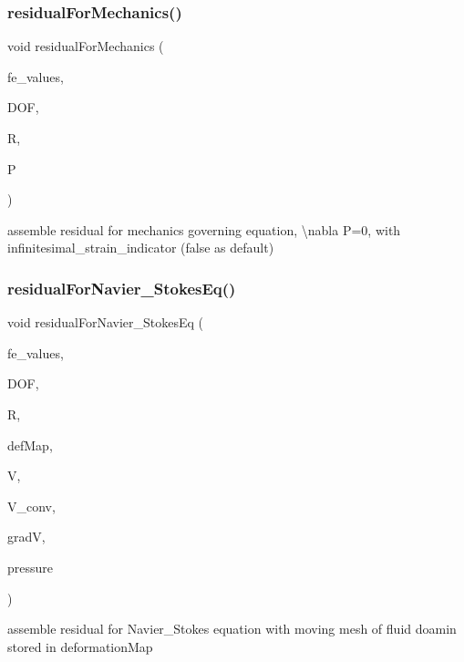 \subsubsection{\texorpdfstring{residualForMechanics()}{residualForMechanics()}}
{\footnotesize\ttfamily void residual\+For\+Mechanics (\begin{DoxyParamCaption}\item[{const F\+E\+Values$<$ dim $>$ \&}]{fe\+\_\+values,  }\item[{unsigned int}]{D\+OF,  }\item[{Table$<$ 1, T $>$ \&}]{R,  }\item[{dealii\+::\+Table$<$ 3, T $>$}]{P }\end{DoxyParamCaption})}

assemble residual for mechanics governing equation, \textbackslash{}nabla P=0, with infinitesimal\+\_\+strain\+\_\+indicator (false as default) \mbox{\label{class_residual_a34f1f680e957e21ac47c35f404e9fd6a}} 
\subsubsection{\texorpdfstring{residualForNavier\_StokesEq()}{residualForNavier\_StokesEq()}}
{\footnotesize\ttfamily void residual\+For\+Navier\+\_\+\+Stokes\+Eq (\begin{DoxyParamCaption}\item[{const F\+E\+Values$<$ dim $>$ \&}]{fe\+\_\+values,  }\item[{unsigned int}]{D\+OF,  }\item[{Table$<$ 1, T $>$ \&}]{R,  }\item[{\mbox{\hyperlink{structdeformation_map}{deformation\+Map}}$<$ T, dim $>$ \&}]{def\+Map,  }\item[{Table$<$ 2, T $>$ \&}]{V,  }\item[{dealii\+::\+Table$<$ 2, double $>$ \&}]{V\+\_\+conv,  }\item[{Table$<$ 3, T $>$ \&}]{gradV,  }\item[{dealii\+::\+Table$<$ 1, T $>$ \&}]{pressure }\end{DoxyParamCaption})}

assemble residual for Navier\+\_\+\+Stokes equation with moving mesh of fluid doamin stored in deformation\+Map \mbox{\label{class_residual_a4c8fd158c8034b25780abfe785755baa}} 
